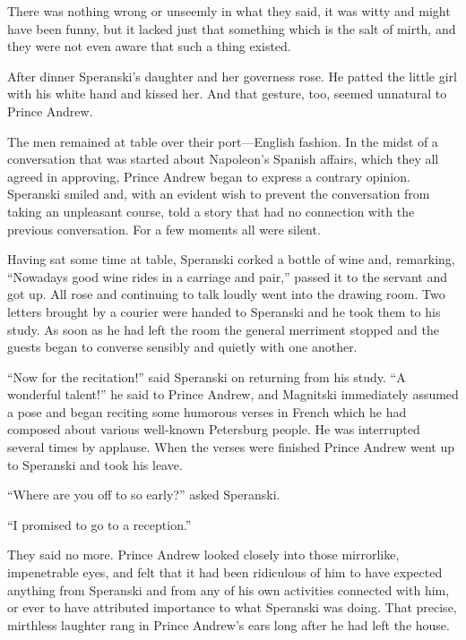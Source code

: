 There was nothing wrong or unseemly in what they said, it was
witty and might have been funny, but it lacked just that
something which is the salt of mirth, and they were not even
aware that such a thing existed.

After dinner Speranski's daughter and her governess rose. He
patted the little girl with his white hand and kissed her. And
that gesture, too, seemed unnatural to Prince Andrew.

The men remained at table over their port---English fashion. In
the midst of a conversation that was started about Napoleon's
Spanish affairs, which they all agreed in approving, Prince
Andrew began to express a contrary opinion. Speranski smiled and,
with an evident wish to prevent the conversation from taking an
unpleasant course, told a story that had no connection with the
previous conversation. For a few moments all were silent.

Having sat some time at table, Speranski corked a bottle of wine
and, remarking, ``Nowadays good wine rides in a carriage and
pair,'' passed it to the servant and got up. All rose and
continuing to talk loudly went into the drawing room. Two letters
brought by a courier were handed to Speranski and he took them to
his study. As soon as he had left the room the general merriment
stopped and the guests began to converse sensibly and quietly
with one another.

``Now for the recitation!'' said Speranski on returning from his
study. ``A wonderful talent!'' he said to Prince Andrew, and
Magnitski immediately assumed a pose and began reciting some
humorous verses in French which he had composed about various
well-known Petersburg people. He was interrupted several times by
applause. When the verses were finished Prince Andrew went up to
Speranski and took his leave.

``Where are you off to so early?'' asked Speranski.

``I promised to go to a reception.''

They said no more. Prince Andrew looked closely into those
mirrorlike, impenetrable eyes, and felt that it had been
ridiculous of him to have expected anything from Speranski and
from any of his own activities connected with him, or ever to
have attributed importance to what Speranski was doing. That
precise, mirthless laughter rang in Prince Andrew's ears long
after he had left the house.

